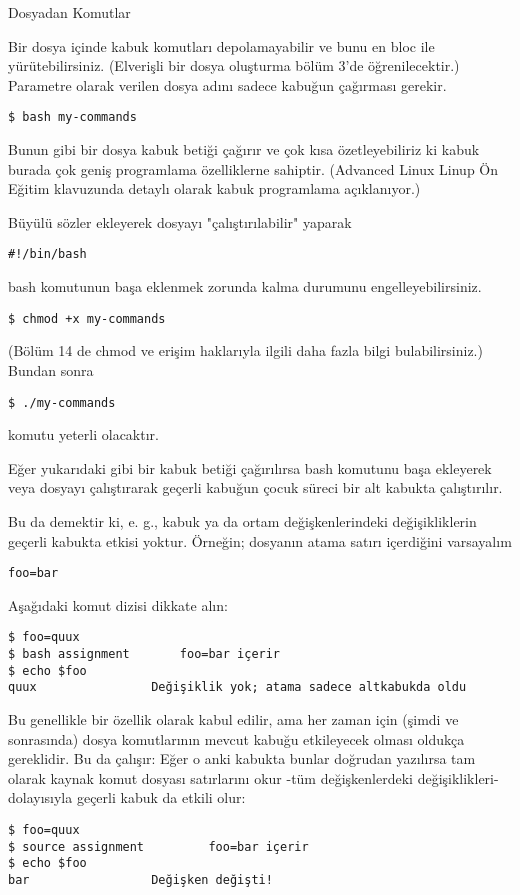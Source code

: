 \begin{section}{Dosyadan Komutlar}

Bir dosya içinde kabuk komutları depolamayabilir ve bunu en bloc ile yürütebilirsiniz. (Elverişli bir dosya oluşturma bölüm 3'de öğrenilecektir.) Parametre olarak verilen dosya adını sadece kabuğun çağırması gerekir.
\begin{verbatim}
$ bash my-commands
\end{verbatim}

Bunun gibi bir dosya kabuk betiği çağırır ve çok kısa özetleyebiliriz ki kabuk burada çok geniş programlama özelliklerne sahiptir. (Advanced Linux Linup Ön Eğitim klavuzunda detaylı olarak kabuk programlama açıklanıyor.)

Büyülü sözler ekleyerek dosyayı "çalıştırılabilir" yaparak
\begin{verbatim}
#!/bin/bash
\end{verbatim}
		
bash komutunun başa eklenmek zorunda kalma durumunu engelleyebilirsiniz.
\begin{verbatim}
$ chmod +x my-commands
\end{verbatim}
		
(Bölüm 14 de chmod ve erişim haklarıyla ilgili daha fazla bilgi bulabilirsiniz.) Bundan sonra
\begin{verbatim}
$ ./my-commands
\end{verbatim}
komutu yeterli olacaktır.

Eğer yukarıdaki gibi bir kabuk betiği çağırılırsa bash komutunu başa ekleyerek veya dosyayı çalıştırarak geçerli kabuğun çocuk süreci bir alt kabukta çalıştırılır.

Bu da demektir ki, e. g., kabuk ya da ortam değişkenlerindeki değişikliklerin geçerli kabukta etkisi yoktur. Örneğin; dosyanın atama satırı içerdiğini varsayalım
\begin{verbatim}
foo=bar
\end{verbatim}

Aşağıdaki komut dizisi dikkate alın:
\begin{verbatim}
$ foo=quux
$ bash assignment 		foo=bar içerir
$ echo $foo
quux 				Değişiklik yok; atama sadece altkabukda oldu
\end{verbatim} 

Bu genellikle bir özellik olarak kabul edilir, ama her zaman için (şimdi ve sonrasında) dosya komutlarının mevcut kabuğu etkileyecek olması oldukça gereklidir. Bu da çalışır: Eğer o anki kabukta bunlar doğrudan yazılırsa tam olarak kaynak komut dosyası satırlarını okur -tüm değişkenlerdeki değişiklikleri- dolayısıyla geçerli kabuk da etkili olur:
\begin{verbatim}
$ foo=quux
$ source assignment 		foo=bar içerir
$ echo $foo
bar 				Değişken değişti!
\end{verbatim}


\end{section}
